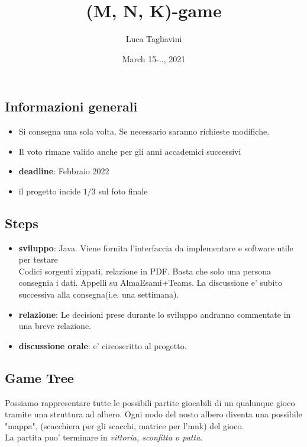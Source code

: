\documentclass{article}
\title{\textbf{(M, N, K)-game}}
\author{Luca Tagliavini}
\date{March 15-.., 2021}
\begin{document}
\maketitle
\tableofcontents
\pagebreak

\subsection{Informazioni generali}

\begin{itemize}
  \item Si consegna una sola volta. Se necessario saranno richieste modifiche.
  \item Il voto rimane valido anche per gli anni accademici successivi
  \item \textbf{deadline}: Febbraio 2022
  \item il progetto incide $1/3$ sul foto finale
\end{itemize}

\subsection{Steps}

\begin{itemize}
  \item \textbf{sviluppo}: Java. Viene fornita l'interfaccia da implementare
    e software utile per testare \\
    Codici sorgenti zippati, relazione in PDF. Basta che solo una persona
    consegnia i dati. Appelli su AlmaEsami+Teams. La discussione e' subito
    successiva alla consegna(i.e. una settimana).
  \item \textbf{relazione}: Le decisioni prese durante lo sviluppo
    andranno commentate in una breve relazione.
  \item \textbf{discussione orale}: e' circoscritto al progetto.
\end{itemize}

\subsection{Game Tree}

Possiamo rappresentare tutte le possibili partite giocabili di un qualunque gioco
tramite una struttura ad albero. Ogni nodo del nosto albero diventa una possibile
"mappa", (scacchiera per gli scacchi, matrice per l'mnk) del gioco. \\
La partita puo' terminare in \emph{vittoria, sconfitta o patta}.
\end{document}

